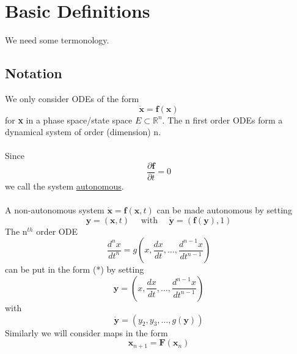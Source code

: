 \documentclass{article}
\newcommand{\xeq}[1] { \dot{\bm{ #1 }} = \bm{f}(\bm{ #1}) } %
\begin{document}
\section{Basic Definitions}
We need some termonology.
\subsection{Notation}
We only consider ODEs of the form 
\begin{equation}\tag{*}
\xeq{x}
\end{equation}
for \textbf{x} in a phase space/state space $E \subset \mathbb{R}^{n}$.
The n first order ODEs form a dynamical system of order (dimension) n.
\\
\\
Since
\[ \frac{\partial \textbf{f} } { \partial t} = 0 \]
 we call the system \underline{autonomous}.
\\
\\
A non-autonomous system $\dot{\textbf{x}} = \textbf{f}(\textbf{x} ,t) $ can be
made autonomous by setting
\[ \textbf{y} = ( \textbf{x},t) \quad \mbox{ with } \quad \dot{\textbf{y}} = ( \textbf{f}(\textbf{y}),1) \]
The n$^{th}$ order ODE
\[ \frac{d ^n x}{d t^n} = g \left( x , \frac{d x}{d t} , \dots , \frac{d^{n-1} x}{d t^{n-1}} \right) \]
can be put in the form (*) by setting
\[ \textbf{y} =  \left( x , \frac{d x}{d t} , \dots , \frac{d^{n-1} x}{d t^{n-1}} \right) \]
with 
\[ \dot{\textbf{y}} =  \left( y_2 , y_3 , \dots , g( \textbf{y}) \right) \]
Similarly we will consider maps in the form
\[ \textbf{x}_{n+1} = \textbf{F}(\textbf{x}_n) \]
\end{document}
